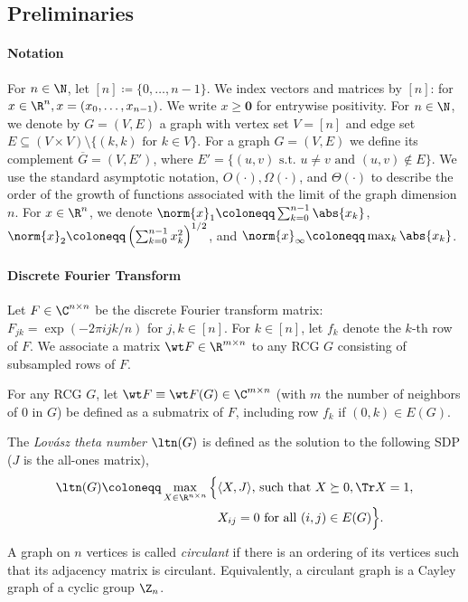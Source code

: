 \subsection{Preliminaries}
\paragraph*{Notation}
For \(n \in \N\), let \([n] \coloneqq \{0, \ldots, n - 1\}\). We index vectors and matrices by \([n]\): for \(x 
\in \R^n, x = (x_0, \ldots, x_{n-1})\). We write \(x \geq \mathbf{0}\) for entrywise positivity.
For \(n \in \N\), we denote by \(G = (V, E)\) a graph with vertex set \(V = [n]\) 
and edge set \(E \subseteq (V \times V) \setminus \{(k, k) \text{ for } k \in V\}\).
For a graph \(G = (V, E)\) we define its complement \(\overline{G} = (V, E')\),
where \(E' = \{(u, v) \text{ s.t. } u \neq v \text{ and } (u, v) \notin E\}\).
We use the standard asymptotic notation, $O(\cdot), \Omega(\cdot)$, and $\Theta(\cdot)$ to describe the order of the growth of functions associated with the limit of the graph dimension $n$. For \(x \in \R^n\), we denote \(\norm{x}_1 \coloneqq \sum_{k=0}^{n - 1} \abs{x_k}\), \(\norm{x}_2 \coloneqq \left(\sum_{k=0}^{n-1} x_k^2\right)^{1/2}\), and \(\norm{x}_{\infty} \coloneqq \max_{k}\abs{x_k}\).

\paragraph*{Discrete Fourier Transform}
Let \(F \in \C^{n \times n}\) be the discrete Fourier transform matrix: \(F_{jk} = \exp(-2 \pi i jk/n)\) for \(j, k \in [n]\). For \(k \in [n]\), let \(f_k\) denote the \(k\)-th row of \(F\).
We associate a matrix \(\wt F \in \R^{m \times n}\) to any RCG $G$ consisting of subsampled rows of \(F\).
\begin{definition}
\label{def:f_tilde}
For any RCG $G$, let $\wt F \equiv \wt F (G) \in \C^{m \times n}$ (with $m$ the number of neighbors of $0$ in $G$)  be defined as a submatrix of \(F\), including row \(f_k\) if $(0,k) \in E(G).$
\end{definition}

\begin{definition}
 The \emph{Lovász theta number} \(\ltn(G)\) is defined as the solution to the following SDP (\(J\) is the all-ones matrix),
\begin{equation}
\label{def:ltn}
\begin{aligned}
    \ltn(G) \coloneqq \max_{X \in \R^{n \times n}}
    \Big\{&\langle X, J \rangle \text{, such that } X \succeq 0, \Tr X = 1, \\
    &X_{ij} = 0\text{ for all }(i, j) \in E(G)\Big\}.
\end{aligned}
\end{equation}
\end{definition}
\begin{definition}
\label{def:circ_graph}
 A graph on $n$ vertices is called \emph{circulant} if there is an ordering of its vertices such that its adjacency matrix is circulant. Equivalently, a circulant graph is a Cayley graph of a cyclic group \(\Z_n\).
\end{definition}

